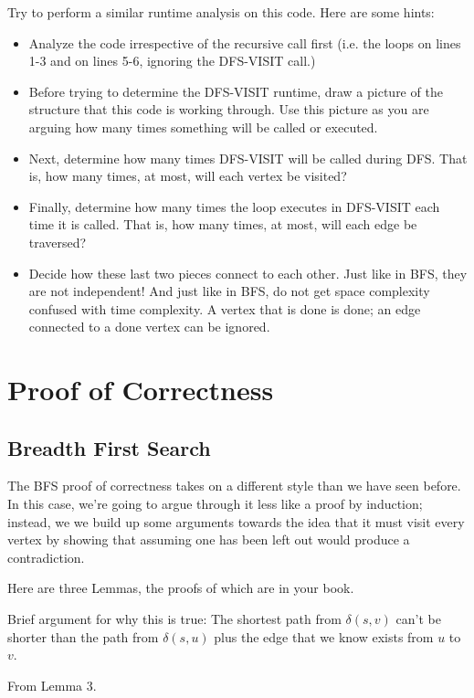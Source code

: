 \documentclass[]{article}
\begin{document}
Try to perform a similar runtime analysis on this code. Here are some hints:

\begin{itemize}
    \item Analyze the code irrespective of the recursive call first (i.e. the loops on lines 1-3 and on lines 5-6, ignoring the DFS-VISIT call.)
    \item Before trying to determine the DFS-VISIT runtime, draw a picture of the structure that this code is working through. Use this picture as you are arguing how many times something will be called or executed. 
    \item Next, determine how many times DFS-VISIT will be called during DFS. That is, how many times, at most, will each vertex be visited? 
    \item Finally, determine how many times the loop executes in DFS-VISIT each time it is called. That is, how many times, at most, will each edge be traversed? 
    \item Decide how these last two pieces connect to each other. Just like in BFS, they are not independent! And just like in BFS, do not get space complexity confused with time complexity. A vertex that is done is done; an edge connected to a done vertex can be ignored. 
\end{itemize}

\section*{Proof of Correctness}

\subsection*{Breadth First Search}

The BFS proof of correctness takes on a different style than we have seen before. In this case, we're going to argue through it less like a proof by induction; instead, we we build up some arguments towards the idea that it must visit every vertex by showing that assuming one has been left out would produce a contradiction. 

Here are three Lemmas, the proofs of which are in your book. 


Brief argument for why this is true: The shortest path from $\delta(s,v)$ can't be shorter than the path from $\delta(s,u)$ plus the edge that we know exists from $u$ to $v$. 


From Lemma 3.
\end{document}
